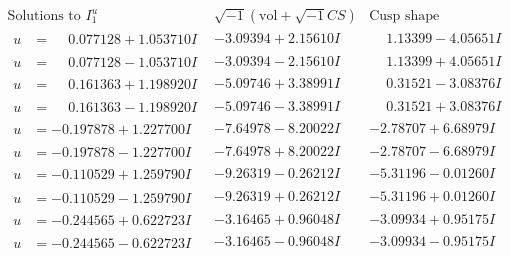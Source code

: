 \documentclass[1p]{elsarticle_modified}
\theoremstyle{definition}
\newcommand{\I}{\sqrt{-1}}
\begin{document}
$$\begin{array}{c|c|c}  
\text{Solutions to }I^u_{1}& \I (\text{vol} + \sqrt{-1}CS) & \text{Cusp shape}\\
 \hline 
\begin{aligned}
u &= \phantom{-}0.077128 + 1.053710 I\end{aligned}
 & -3.09394 + 2.15610 I & \phantom{-}1.13399 - 4.05651 I \\ \hline\begin{aligned}
u &= \phantom{-}0.077128 - 1.053710 I\end{aligned}
 & -3.09394 - 2.15610 I & \phantom{-}1.13399 + 4.05651 I \\ \hline\begin{aligned}
u &= \phantom{-}0.161363 + 1.198920 I\end{aligned}
 & -5.09746 + 3.38991 I & \phantom{-}0.31521 - 3.08376 I \\ \hline\begin{aligned}
u &= \phantom{-}0.161363 - 1.198920 I\end{aligned}
 & -5.09746 - 3.38991 I & \phantom{-}0.31521 + 3.08376 I \\ \hline\begin{aligned}
u &= -0.197878 + 1.227700 I\end{aligned}
 & -7.64978 - 8.20022 I & -2.78707 + 6.68979 I \\ \hline\begin{aligned}
u &= -0.197878 - 1.227700 I\end{aligned}
 & -7.64978 + 8.20022 I & -2.78707 - 6.68979 I \\ \hline\begin{aligned}
u &= -0.110529 + 1.259790 I\end{aligned}
 & -9.26319 - 0.26212 I & -5.31196 - 0.01260 I \\ \hline\begin{aligned}
u &= -0.110529 - 1.259790 I\end{aligned}
 & -9.26319 + 0.26212 I & -5.31196 + 0.01260 I \\ \hline\begin{aligned}
u &= -0.244565 + 0.622723 I\end{aligned}
 & -3.16465 + 0.96048 I & -3.09934 + 0.95175 I \\ \hline\begin{aligned}
u &= -0.244565 - 0.622723 I\end{aligned}
 & -3.16465 - 0.96048 I & -3.09934 - 0.95175 I \\ \hline\begin{aligned}

\end{aligned}
\end{array}$$
\end{document}
